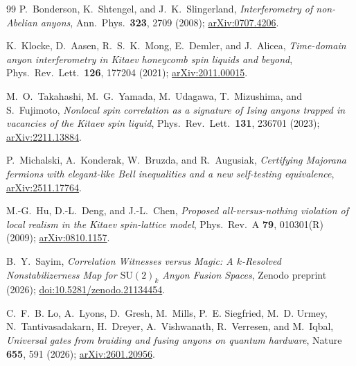 \documentclass[aps,pra,twocolumn,superscriptaddress,floatfix,nofootinbib]{revtex4-2}
\begin{document}
\begin{thebibliography}{99}
P.~Bonderson, K.~Shtengel, and J.~K.~Slingerland,
\emph{Interferometry of non-Abelian anyons},
Ann.\ Phys.\ \textbf{323}, 2709 (2008);
\href{https://arxiv.org/abs/0707.4206}{arXiv:0707.4206}.

K.~Klocke, D.~Aasen, R.~S.~K.~Mong, E.~Demler, and J.~Alicea,
\emph{Time-domain anyon interferometry in Kitaev honeycomb spin
liquids and beyond},
Phys.\ Rev.\ Lett.\ \textbf{126}, 177204 (2021);
\href{https://arxiv.org/abs/2011.00015}{arXiv:2011.00015}.

M.~O.~Takahashi, M.~G.~Yamada, M.~Udagawa, T.~Mizushima, and S.~Fujimoto,
\emph{Nonlocal spin correlation as a signature of Ising anyons
trapped in vacancies of the Kitaev spin liquid},
Phys.\ Rev.\ Lett.\ \textbf{131}, 236701 (2023);
\href{https://arxiv.org/abs/2211.13884}{arXiv:2211.13884}.

P.~Michalski, A.~Konderak, W.~Bruzda, and R.~Augusiak,
\emph{Certifying Majorana fermions with elegant-like Bell inequalities
and a new self-testing equivalence},
\href{https://arxiv.org/abs/2511.17764}{arXiv:2511.17764}.

M.-G.~Hu, D.-L.~Deng, and J.-L.~Chen,
\emph{Proposed all-versus-nothing violation of local realism in the
Kitaev spin-lattice model},
Phys.\ Rev.\ A \textbf{79}, 010301(R) (2009);
\href{https://arxiv.org/abs/0810.1157}{arXiv:0810.1157}.

B.~Y.~Sayim,
\emph{Correlation Witnesses versus Magic: A $k$-Resolved
Nonstabilizerness Map for $\mathrm{SU}(2)_k$ Anyon Fusion Spaces},
Zenodo preprint (2026);
\href{https://doi.org/10.5281/zenodo.21134454}{doi:10.5281/zenodo.21134454}.

C.~F.~B. Lo, A.~Lyons, D.~Gresh, M.~Mills, P.~E. Siegfried, M.~D. Urmey,
N.~Tantivasadakarn, H.~Dreyer, A.~Vishwanath, R.~Verresen, and M.~Iqbal,
\emph{Universal gates from braiding and fusing anyons on quantum hardware},
Nature \textbf{655}, 591 (2026);
\href{https://arxiv.org/abs/2601.20956}{arXiv:2601.20956}.

\end{thebibliography}
\end{document}
